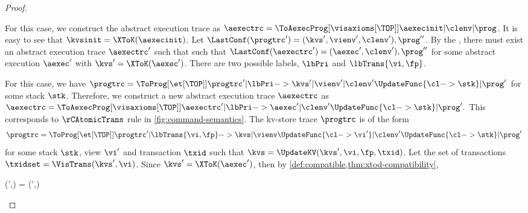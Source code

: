 \begin{proof}
\begin{enumerate}
    \begin{enumerate}
    \CaseBase{\( \progtrc = \ToProg[\et[\TOP]]{\kvsinit | \vienvinit | \clenv | \prog }\)}
        For this case, we construct the abstract execution trace as 
        \( \aexectrc = \ToAexecProg[\visaxioms[\TOP]]{\aexecinit | \clenv | \prog } \).
        It is easy to see that \( \kvsinit = \XToK(\aexecinit) \).
        Let \( \LastConf(\progtrc') = (\kvs',\vienv',\clenv'), \prog'' \).
        By the \ih, there must exist an abstract execution trace \( \aexectrc' \) such that 
        such that \( \LastConf(\aexectrc') = (\aexec',\clenv'), \prog'' \) 
        for some abstract execution \( \aexec' \) with \( \kvs' = \XToK(\aexec') \).
        There are two possible labels, \( \lbPri\) and \( \lbTrans{\vi,\fp} \).
        \begin{enumerate}
        \Case{\( \lb = \lbPri \)} For this case, we have 
            \(
                \progtrc = \ToProg[\et[\TOP]]{ \progtrc' | \lbPri 
                                    -> \kvs' | \vienv' | \clenv'\UpdateFunc{\cl -> \stk} | \prog' } 
            \)
            for some stack \( \stk \).
            Therefore, we construct a new abstract execution trace \( \aexectrc \) as 
            \(
                \aexectrc = \ToAexecProg[\visaxioms[\TOP]]{ \aexectrc' | \lbPri 
                                -> \aexec' | \clenv'\UpdateFunc{\cl -> \stk} | \prog'  } .
            \)
        \Case{\( \lb = \lbTrans{\vi,\fp} \)}
            This corresponds to \( \rCAtomicTrans \) rule in \cref{fig:command-semantics}.
            The kv-store trace \( \progtrc \) is of the form
            \[
                \progtrc = \ToProg[\et[\TOP]]{ \progtrc' | \lbTrans{\vi,\fp} 
                                    -> \kvs | \vienv\UpdateFunc{\cl -> \vi'} 
                                                    | \clenv'\UpdateFunc{\cl -> \stk} | \prog' }
            \]
            for some stack \( \stk \), view \( \vi' \) and transaction \( \txid \) such that
            \( \kvs = \UpdateKV(\kvs',\vi,\fp,\txid) \).
            Let the set of transactions \( \txidset = \VisTrans(\kvs', \vi) \).
            Since \( \kvs' = \XToK(\aexec') \), then by \cref{def:compatible,thm:xtod-compatibility},
            \begin{Formulae}
            \begin{Formula}
                \Snapshot(\kvs',\vi) = \AexecSnapshot(\aexec',\txidset)
            \label{equ:vi-snapshot-to-txidset-snapshot}

\end{Formula}
\end{Formulae}
\end{enumerate}
\end{enumerate}
\end{enumerate}
\end{proof}
